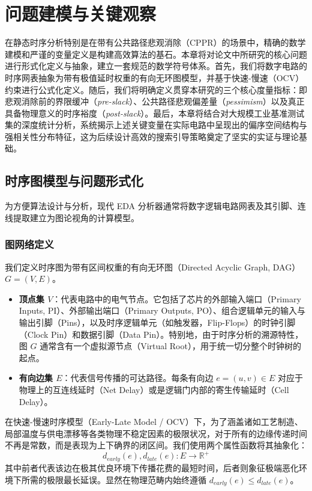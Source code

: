 \chapter{问题建模与关键观察}
\label{chap:modeling}

在静态时序分析特别是在带有公共路径悲观消除（CPPR）的场景中，精确的数学建模和严谨的变量定义是构建高效算法的基石。本章将对论文中所研究的核心问题进行形式化定义与抽象，建立一套规范的数学符号体系。首先，我们将数字电路的时序网表抽象为带有极值延时权重的有向无环图模型，并基于快速-慢速（OCV）约束进行公式化定义。随后，我们将明确定义贯穿本研究的三个核心度量指标：即悲观消除前的界限缓冲（\textit{pre-slack}）、公共路径悲观偏差量（\textit{pessimism}）以及真正具备物理意义的时序裕度（\textit{post-slack}）。最后，本章将结合对大规模工业基准测试集的深度统计分析，系统揭示上述关键变量在实际电路中呈现出的偏序空间结构与强相关性分布特征，这为后续设计高效的搜索引导策略奠定了坚实的实证与理论基础。

\section{时序图模型与问题形式化}
\label{sec:formal_graph}

为方便算法设计与分析，现代 EDA 分析器通常将数字逻辑电路网表及其引脚、连线提取建立为图论视角的计算模型。

\subsection{图网络定义}
我们定义时序图为带有区间权重的有向无环图（Directed Acyclic Graph, DAG） $G = (V, E)$。
\begin{itemize}
    \item \textbf{顶点集 $V$}：代表电路中的电气节点。它包括了芯片的外部输入端口（Primary Inputs, PI）、外部输出端口（Primary Outputs, PO）、组合逻辑单元的输入与输出引脚（Pins），以及时序逻辑单元（如触发器，Flip-Flops）的时钟引脚（Clock Pin）和数据引脚（Data Pin）。特别地，由于时序分析的溯源特性，图 $G$ 通常含有一个虚拟源节点（Virtual Root），用于统一切分整个时钟树的起点。
    \item \textbf{有向边集 $E$}：代表信号传播的可达路径。每条有向边 $e = (u,v) \in E$ 对应于物理上的互连线延时（Net Delay）或是逻辑门内部的寄生传输延时（Cell Delay）。
\end{itemize}

在快速-慢速时序模型（Early-Late Model / OCV）下，为了涵盖诸如工艺制造、局部温度与供电漂移等各类物理不稳定因素的极限状况，对于所有的边缘传递时间不再是常数，而是表现为上下确界的闭区间。我们使用两个属性函数将其抽象化：
\begin{equation}
    d_{early}(e), d_{late}(e) : E \to \mathbb{R}^+
\end{equation}
其中前者代表该边在极其优良环境下传播花费的最短时间，后者则象征极端恶化环境下所需的极限最长延误。显然在物理范畴内始终遵循 $d_{early}(e) \le d_{late}(e)$。

